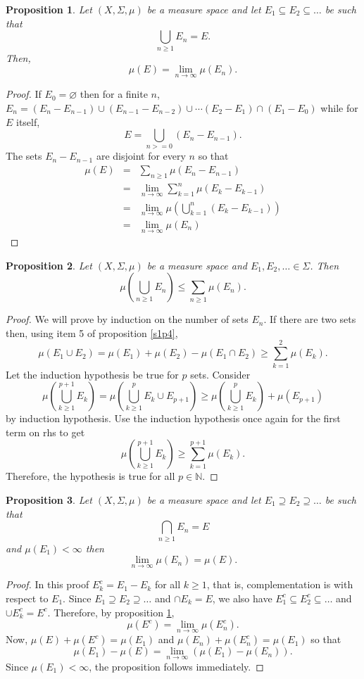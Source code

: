 \documentclass{article}
\theoremstyle{plain}
\numberwithin{thm}{section}
\theoremstyle{plain}
\newtheorem{prop}{Proposition}
\numberwithin{prop}{section}
\theoremstyle{definition}
\numberwithin{defn}{section}
\theoremstyle{remark}
\numberwithin{equation}{section}
\begin{document}
\begin{prop}\label{s1p5}Let $(X, \Sigma, \mu)$ be a measure space and let
$E_1 \subseteq E_2 \subseteq \ldots$ be such that
\[
\bigcup_{n \ge 1}E_n = E.
\]
Then,
\[
\mu(E) = \lim_{n \rightarrow \infty}\mu(E_n).
\]
\end{prop}
\begin{proof}
If $E_0 = \varnothing$ then for a finite $n$, $E_n = (E_n - E_{n-1}) \cup 
(E_{n-1} - E_{n-2}) \cup \cdots (E_2 - E_1) \cap (E_1 - E_0)$ while for $E$ 
itself,
\[
E = \bigcup_{n >= 0} (E_{n} - E_{n-1}).
\]
The sets $E_{n} - E_{n-1}$ are disjoint for every $n$ so that
\begin{eqnarray*}
\mu(E) &=& \sum_{n \ge 1} \mu(E_n - E_{n-1}) \\
  &=& \lim_{n \rightarrow \infty}\sum_{k=1}^n \mu(E_k - E_{k-1}) \\
  &=& \lim_{n \rightarrow \infty}\mu\left(\bigcup_{k=1}^n (E_k - E_{k-1})\right) \\
  &=& \lim_{n \rightarrow \infty}\mu(E_n)
\end{eqnarray*}
\end{proof}

\begin{prop}\label{s1p6}Let $(X, \Sigma, \mu)$ be a measure space and
$E_1, E_2, \ldots \in \Sigma$. Then
\[
\mu\left(\bigcup_{n \ge 1}E_n\right) \le \sum_{n \ge 1}\mu(E_n).
\]
\end{prop}
\begin{proof}
We will prove by induction on the number of sets $E_n$. If there are two sets
then, using item 5 of proposition \ref{s1p4},
\[
\mu(E_1 \cup E_2) = \mu(E_1) + \mu(E_2) - \mu(E_1 \cap E_2) \ge \sum_{k=1}^2\mu(E_k).
\]
Let the induction hypothesis be true for $p$ sets. Consider
\[
\mu\left(\bigcup_{k \ge 1}^{p+1}E_k\right) = 
\mu\left(\bigcup_{k \ge 1}^{p}E_k \cup E_{p+1}\right) \ge 
\mu\left(\bigcup_{k \ge 1}^{p}E_k\right) + \mu(E_{p+1})
\]
by induction hypothesis. Use the induction hypothesis once again for the first
term on rhs to get
\[
\mu\left(\bigcup_{k \ge 1}^{p+1}E_k\right) \ge \sum_{k=1}^{p+1}\mu(E_k).
\]
Therefore, the hypothesis is true for all $p \in \mathbb{N}$.
\end{proof}

\begin{prop}\label{s1p7}Let $(X, \Sigma, \mu)$ be a measure space and let
$E_1 \supseteq E_2 \supseteq \ldots$ be such that 
\[
\bigcap_{n \ge 1}E_n = E
\]
and $\mu(E_1) < \infty$ then
\[
\lim_{n \rightarrow \infty}\mu(E_n) = \mu(E).
\]
\end{prop}
\begin{proof}
In this proof $E_k^c = E_1 - E_k$ for all $k \ge 1$, that is, complementation is
with respect to $E_1$. Since $E_1 \supseteq E_2 \supseteq \ldots$ and $\cap E_k 
= E$, we also have $E_1^c \subseteq E_2^c \subseteq \ldots$ and $\cup E_k^c = E^c$.
Therefore, by proposition \ref{s1p5},
\[
\mu(E^c) = \lim_{n \rightarrow \infty}\mu(E_n^c).
\]
Now, $\mu(E) + \mu(E^c) = \mu(E_1)$ and $\mu(E_n) + \mu(E_n^c) = \mu(E_1)$ so that
\[
\mu(E_1) - \mu(E) = \lim_{n \rightarrow \infty}(\mu(E_1) - \mu(E_n)).
\]
Since $\mu(E_1) < \infty$, the proposition follows immediately.
\end{proof}
\end{document}
